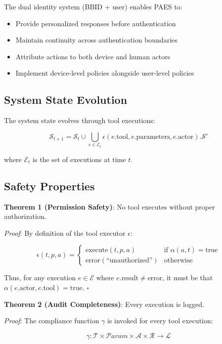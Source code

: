 \documentclass[11pt,a4paper]{article}
\begin{document}
The dual identity system (BBID + user) enables PAES to:
\begin{itemize}
    \item Provide personalized responses before authentication
    \item Maintain continuity across authentication boundaries
    \item Attribute actions to both device and human actors
    \item Implement device-level policies alongside user-level policies
\end{itemize}

\subsection{System State Evolution}

The system state evolves through tool executions:

\[
\mathcal{S}_{t+1} = \mathcal{S}_t \cup \bigcup_{e \in \mathcal{E}_t} \epsilon(e.\text{tool}, e.\text{parameters}, e.\text{actor}).\mathcal{S}'
\]

where $\mathcal{E}_t$ is the set of executions at time $t$.

\subsection{Safety Properties}

\textbf{Theorem 1 (Permission Safety)}: No tool executes without proper authorization.

\textit{Proof}: By definition of the tool executor $\epsilon$:

\[
\epsilon(t, p, a) = \begin{cases}
\text{execute}(t, p, a) & \text{if } \alpha(a, t) = \text{true} \\
\text{error}(\text{``unauthorized''}) & \text{otherwise}
\end{cases}
\]

Thus, for any execution $e \in \mathcal{E}$ where $e.\text{result} \neq \text{error}$, it must be that $\alpha(e.\text{actor}, e.\text{tool}) = \text{true}$. $\square$

\textbf{Theorem 2 (Audit Completeness)}: Every execution is logged.

\textit{Proof}: The compliance function $\gamma$ is invoked for every tool execution:

\[
\gamma: \mathcal{T} \times \mathcal{P}aram \times \mathcal{A} \times \mathcal{R} \rightarrow \mathcal{L}
\]
\end{document}
